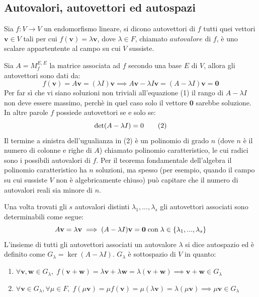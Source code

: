 \documentclass{article}
\begin{document}
\vspace{10pt}
\subsection{Autovalori, autovettori ed autospazi} \label{subsec:linappeigen}
    Sia $f : V \rightarrow V$ un endomorfismo lineare, si dicono autovettori di $f$ tutti quei vettori $\mathbf{v} \in V$ tali per cui $f(\mathbf{v}) = \lambda \mathbf{v}$, dove $\lambda \in F$, chiamato $autovalore$ di $f$, è uno scalare appartentente al campo su cui $V$ sussiste. 

    \vspace{10pt}
    Sia $A = M_{f}^{E, E}$ la matrice associata ad $f$ secondo una base $E$ di $V$, allora gli autovettori sono dati da:
    \[
        f(\mathbf{v}) = A \mathbf{v} = (\lambda I) \mathbf{v} \implies A \mathbf{v} - \lambda I \mathbf{v} = (A - \lambda I) \mathbf{v} = \mathbf{0} \tag{1}
    \] 
    Per far sì che vi siano soluzioni non triviali all'equazione (1) il rango di $A - \lambda I$ non deve essere massimo, perchè in quel caso solo il vettore $\mathbf{0}$ sarebbe soluzione.
    In altre parole $f$ possiede autovettori se e solo se:
    \[
        \textnormal{det}(A - \lambda I) = 0 \tag{2}
    \]
    Il termine a sinistra dell'ugualianza in (2) è un polinomio di grado $n$ (dove $n$ è il numero di colonne e righe di $A$) chiamato polinomio caratteristico, 
    le cui radici sono i possibili autovalori di $f$. Per il teorema fondamentale dell'algebra il polinomio caratteristico ha $n$ soluzioni, ma spesso (per esempio, quando il campo su cui sussiste $V$ non è algebricamente chiuso) può capitare che 
    il numero di autovalori reali sia minore di $n$.

    \vspace{10pt}
    Una volta trovati gli $s$ autovalori distinti $\lambda_1, ..., \lambda_s$ gli autovettori associati sono determinabili come segue:
    \[
        A \mathbf{v} = \lambda \mathbf{v} \implies (A - \lambda I) \mathbf{v} = \mathbf{0} \; \textnormal{con} \; \lambda \in \{\lambda_1, ..., \lambda_s\}
    \]
    L'insieme di tutti gli autovettori associati un autovalore $\lambda$ si dice autospazio ed è definito come $G_{\lambda} = \ker(A - \lambda I)$. $G_{\lambda}$ è sottospazio di $V$ in quanto:
    \begin{enumerate}[label=(\arabic*)]
        \item $\forall \mathbf{v}, \mathbf{w} \in G_{\lambda}, \; f(\mathbf{v} + \mathbf{w}) = \lambda \mathbf{v} + \lambda \mathbf{w} = \lambda (\mathbf{v} + \mathbf{w}) \implies \mathbf{v} + \mathbf{w} \in G_{\lambda}$ 
        \item $\forall \mathbf{v} \in G_{\lambda}, \forall \mu \in F, \; f(\mu \mathbf{v}) = \mu f(\mathbf{v}) = \mu (\lambda \mathbf{v}) = \lambda (\mu \mathbf{v}) \implies \mu \mathbf{v} \in G_{\lambda}$
    \end{enumerate}
\end{document}
